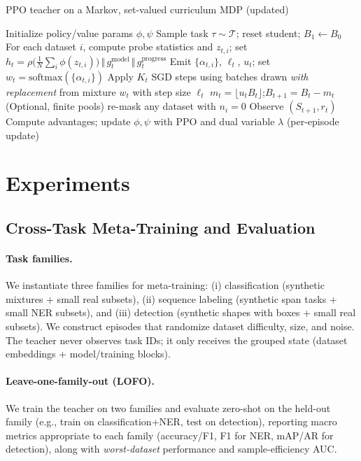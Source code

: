 \documentclass[11pt]{article}
\newcommand{\1}{\mathbf{1}}
\begin{document}
\begin{algorithm}[H]
\caption{PPO teacher on a Markov, set-valued curriculum MDP (updated)}
\label{alg:ppo}
\begin{algorithmic}[1]
\State Initialize policy/value params $\phi,\psi$
    \State Sample task $\tau\sim\mathcal{T}$; reset student; $B_1\leftarrow B_0$
      \State {}
      \State For each dataset $i$, compute probe statistics and $z_{t,i}$; set $h_t=\rho\!\big(\tfrac{1}{N}\sum_i \phi(z_{t,i})\big)\,\Vert\,g^{\text{model}}_t\,\Vert\,g^{\text{progress}}_t$
      \State Emit $\{\alpha_{t,i}\}$, $\ell_t$, $u_t$; set $w_t=\mathrm{softmax}(\{\alpha_{t,i}\})$
      \State Apply $K_t$ SGD steps using batches drawn \emph{with replacement} from mixture $w_t$ with step size $\ell_t$
      \State $m_t=\lfloor u_t B_t\rfloor$;\quad $B_{t+1}=B_t-m_t$
      \State (Optional, finite pools) re-mask any dataset with $n_i=0$
      \State Observe $(S_{t+1}, r_t)$
    \EndFor
  \EndFor
  \State Compute advantages; update $\phi,\psi$ with PPO and dual variable $\lambda$ (per-episode update)
\EndFor
\end{algorithmic}
\end{algorithm}


\section{Experiments}
\subsection{Cross-Task Meta-Training and Evaluation}
\paragraph{Task families.}
We instantiate three families for meta-training: (i) classification (synthetic mixtures + small real subsets), (ii) sequence labeling (synthetic span tasks + small NER subsets), and (iii) detection (synthetic shapes with boxes + small real subsets). 
We construct episodes that randomize dataset difficulty, size, and noise. 
The teacher never observes task IDs; it only receives the grouped state (dataset embeddings + model/training blocks).

\paragraph{Leave-one-family-out (LOFO).}
We train the teacher on two families and evaluate zero-shot on the held-out family (e.g., train on classification+NER, test on detection), reporting macro metrics appropriate to each family (accuracy/F1, F1 for NER, mAP/AR for detection), along with \emph{worst-dataset} performance and sample-efficiency AUC.
\end{document}
